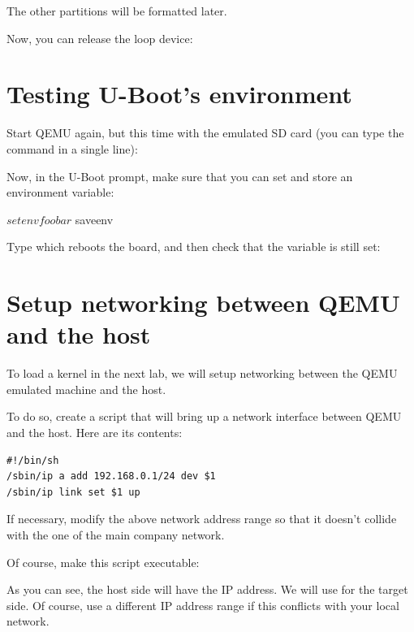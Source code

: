 
The other partitions will be formatted later.

Now, you can release the loop device:

\section{Testing U-Boot's environment}

Start QEMU again, but this time with the emulated SD card
(you can type the command in a single line):


Now, in the U-Boot prompt, make sure that you can set and store an environment variable:

\begin{bashinput}
$ setenv foo bar
$ saveenv
\end{bashinput}

Type  which reboots the board, and then check that the
 variable is still set:


\section{Setup networking between QEMU and the host}

To load a kernel in the next lab, we will setup networking between the QEMU emulated
machine and the host.

To do so, create a  script that will bring up a
network interface between QEMU and the host.  Here are its contents:

\begin{verbatim}
#!/bin/sh
/sbin/ip a add 192.168.0.1/24 dev $1
/sbin/ip link set $1 up
\end{verbatim}

If necessary, modify the above network address range so that
it doesn't collide with the one of the main company network.

Of course, make this script executable:

As you can see, the host side will have the  IP
address. We will use  for the target side.
Of course, use a different IP address range if this conflicts with your
local network.

